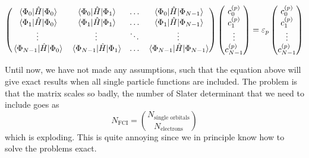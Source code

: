 \begin{equation}
\begin{pmatrix}
\mel{\Phi_0}{\hat{H}}{\Phi_0} & \mel{\Phi_0}{\hat{H}}{\Phi_1} & \hdots & \mel{\Phi_0}{\hat{H}}{\Phi_{N-1}}\\
\mel{\Phi_1}{\hat{H}}{\Phi_0} & \mel{\Phi_1}{\hat{H}}{\Phi_1} & \hdots & \mel{\Phi_1}{\hat{H}}{\Phi_{N-1}}\\
\vdots & \vdots & \ddots & \vdots\\
\mel{\Phi_{N-1}}{\hat{H}}{\Phi_0} & \mel{\Phi_{N-1}}{\hat{H}}{\Phi_1} & \hdots & \mel{\Phi_{N-1}}{\hat{H}}{\Phi_{N-1}}\\
\end{pmatrix}
\begin{pmatrix}
c_0^{(p)}\\ c_1^{(p)} \\ \vdots\\ c_{N-1}^{(p)}
\end{pmatrix}
=\varepsilon_p
\begin{pmatrix}
c_0^{(p)}\\ c_1^{(p)} \\ \vdots\\ c_{N-1}^{(p)}
\end{pmatrix}
\label{eq:CIS_matrix}
\end{equation}

Until now, we have not made any assumptions, such that the equation above will give exact results when all single particle functions are included. The problem is that the matrix scales so badly, the number of Slater determinant that we need to include goes as 
\begin{equation}
N_{\text{FCI}}=\binom{N_{\text{single orbitals}}}{N_{\text{electrons}}}
\end{equation}
which is exploding. This is quite annoying since we in principle know how to solve the problems exact.

